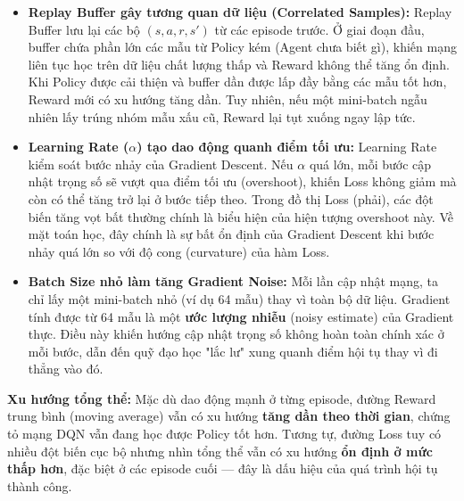 \begin{itemize}
    \item \textbf{Replay Buffer gây tương quan dữ liệu (Correlated Samples):} Replay Buffer lưu lại các bộ $(s, a, r, s')$ từ các episode trước. Ở giai đoạn đầu, buffer chứa phần lớn các mẫu từ Policy kém (Agent chưa biết gì), khiến mạng liên tục học trên dữ liệu chất lượng thấp và Reward không thể tăng ổn định. Khi Policy được cải thiện và buffer dần được lấp đầy bằng các mẫu tốt hơn, Reward mới có xu hướng tăng dần. Tuy nhiên, nếu một mini-batch ngẫu nhiên lấy trúng nhóm mẫu xấu cũ, Reward lại tụt xuống ngay lập tức.

    \item \textbf{Learning Rate ($\alpha$) tạo dao động quanh điểm tối ưu:} Learning Rate kiểm soát bước nhảy của Gradient Descent. Nếu $\alpha$ quá lớn, mỗi bước cập nhật trọng số sẽ vượt qua điểm tối ưu (overshoot), khiến Loss không giảm mà còn có thể tăng trở lại ở bước tiếp theo. Trong đồ thị Loss (phải), các đột biến tăng vọt bất thường chính là biểu hiện của hiện tượng overshoot này. Về mặt toán học, đây chính là sự bất ổn định của Gradient Descent khi bước nhảy quá lớn so với độ cong (curvature) của hàm Loss.

    \item \textbf{Batch Size nhỏ làm tăng Gradient Noise:} Mỗi lần cập nhật mạng, ta chỉ lấy một mini-batch nhỏ (ví dụ 64 mẫu) thay vì toàn bộ dữ liệu. Gradient tính được từ 64 mẫu là một \textbf{ước lượng nhiễu} (noisy estimate) của Gradient thực. Điều này khiến hướng cập nhật trọng số không hoàn toàn chính xác ở mỗi bước, dẫn đến quỹ đạo học "lắc lư" xung quanh điểm hội tụ thay vì đi thẳng vào đó.
\end{itemize}

\textbf{Xu hướng tổng thể:} Mặc dù dao động mạnh ở từng episode, đường Reward trung bình (moving average) vẫn có xu hướng \textbf{tăng dần theo thời gian}, chứng tỏ mạng DQN vẫn đang học được Policy tốt hơn. Tương tự, đường Loss tuy có nhiều đột biến cục bộ nhưng nhìn tổng thể vẫn có xu hướng \textbf{ổn định ở mức thấp hơn}, đặc biệt ở các episode cuối — đây là dấu hiệu của quá trình hội tụ thành công.

